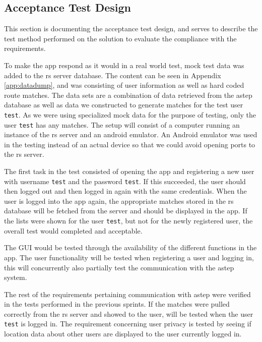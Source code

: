 \subsection{Acceptance Test Design}
This section is documenting the acceptance test design, and serves to describe the test method performed on the solution to evaluate the compliance with the requirements.

To make the app respond as it would in a real world test, mock test data was added to the \gls{rs} server database. 
The content can be seen in Appendix \ref{app:datadump}, and was consisting of user information as well as hard coded route matches.
The data sets are a combination of data retrieved from the \gls{astep} database as well as data we constructed to generate matches for the test user \texttt{test}.
As we were using specialized mock data for the purpose of testing, only the user \texttt{test} has any matches.
The setup will consist of a computer running an instance of the \gls{rs} server and an android emulator.
An Android emulator was used in the testing instead of an actual device so that we could avoid opening ports to the \gls{rs} server.

The first task in the test consisted of opening the app and registering a new user with username \texttt{test} and the password \texttt{test}.
If this succeeded, the user should then logged out and then logged in again with the same credentials.
When the user is logged into the app again, the appropriate matches stored in the \gls{rs} database will be fetched from the server and should be displayed in the app.
If the lists were shown for the user \texttt{test}, but not for the newly registered user, the overall test would completed and acceptable. 

The GUI would be tested through the availability of the different functions in the app.
The user functionality will be tested when registering a user and logging in, this will concurrently also partially test the communication with the \gls{astep} system.

The rest of the requirements pertaining communication with \gls{astep} were verified in the tests performed in the previous sprints.
If the matches were pulled correctly from the \gls{rs} server and showed to the user, will be tested when the user \texttt{test} is logged in.
The requirement concerning user privacy is tested by seeing if location data about other users are displayed to the user currently logged in. 


